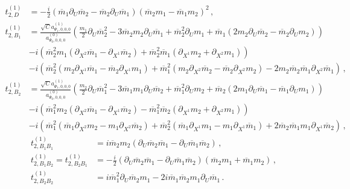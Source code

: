 	\begin{equation}
	\begin{aligned}
	t_{2,D}^{(1)} &= -\frac{i}{2} (\overline{m}_{1} \partial_{U}\overline{m}_{2} - \overline{m}_{2} \partial_{U}\overline{m}_{1} ) (\overline{m}_{2} m_{1}-\overline{m}_{1} m_{2})^2  \, , \\
	t_{2,B_1}^{(1)} &=  \frac{\sqrt{C} a^{(1)}_{\Psi_1,0,0,0}}{a^{(0)}_{\Psi_0,0,0,0}} \left( \frac{m_{1}}{2} \partial_{U}\overline{m}^2_{2} -3 \overline{m}_{2} m_{2} \partial_{U}\overline{m}_{1}  +\overline{m}_{2}^2 \partial_{U}m_{1} + \overline{m}_{1} \left(2 m_{2} \partial_{U}\overline{m}_{2}- \overline{m}_{2}\partial_{U}m_{2}\right) \right) \\ &-i  \left( \overline{m}_{2}^2 m_{1} (\partial_{X^2}\overline{m}_{1}-\partial_{X^1}\overline{m}_{2})+ \overline{m}_{2}^2 \overline{m}_{1} (\partial_{X^1}m_{2}+\partial_{X^2}m_{1}) \right) \\ &-i \left(\overline{m}_{2}^2 \left( m_{2}\partial_{X^1}\overline{m}_{1} -\overline{m}_{2} \partial_{X^1}m_{1}\right)+ \overline{m}_{1}^2\left( m_{2}\partial_{X^2}\overline{m}_{2} - \overline{m}_{2}\partial_{X^2}m_{2} \right)-2 m_{2} \overline{m}_{2} \overline{m}_{1} \partial_{X^2}\overline{m}_{1} \right) \, , \\
	t_{2,B_2}^{(1)} &= \frac{\sqrt{C} a^{(1)}_{\Psi_1,0,0,0}}{a^{(0)}_{\Psi_0,0,0,0}} \left(\frac{m_{2}}{2}\partial_{U}\overline{m}^2_{1} -3 \overline{m}_{1} m_{1} \partial_{U}\overline{m}_{2}+ \overline{m}_{1}^2\partial_{U}m_{2} + \overline{m}_{2}\left( 2 m_{1}  \partial_{U}\overline{m}_{1} -\overline{m}_{1}\partial_{U}m_{1}   \right) \right) \\ &- i \left( \overline{m}_{1}^2 m_{2} (\partial_{X^2}\overline{m}_{1}-\partial_{X^1}\overline{m}_{2})- \overline{m}_{1}^2 \overline{m}_{2} \left(\partial_{X^1}m_{2}+\partial_{X^2}m_{1}\right)\right) \\ &- i \left(\overline{m}_{1}^2 \left(\overline{m}_{1} \partial_{X^2}m_{2}- m_{1} \partial_{X^2}\overline{m}_{2} \right) + \overline{m}_{2}^2 \left(\overline{m}_{1} \partial_{X^1}m_{1}-  m_{1}\partial_{X^1}\overline{m}_{1} \right) + 2 \overline{m}_{2} \overline{m}_{1} m_{1}\partial_{X^1}\overline{m}_{2}\right)  \, , 
	\end{aligned}
	\end{equation}
	\begin{equation}
	\begin{aligned}
	t_{2,B_1 B_1}^{(1)} &=  i \overline{m}_{2} m_{2} (\partial_{U}\overline{m}_{2} \overline{m}_{1}-\partial_{U}\overline{m}_{1} \overline{m}_{2})  \, , \\
	t_{2,B_1 B_2}^{(1)} = t_{2,B_2 B_1}^{(1)}  &= - \frac{i}{2} (\partial_{U}\overline{m}_{2} \overline{m}_{1}-\partial_{U}\overline{m}_{1} \overline{m}_{2}) (\overline{m}_{2} m_{1}+\overline{m}_{1} m_{2})  \, , \\
	t_{2,B_2 B_2}^{(1)} &= i \overline{m}_{1}^2 \partial_{U}\overline{m}_{2}  m_{1} -2 i \overline{m}_{1} \overline{m}_{2} m_{1} \partial_{U}\overline{m}_{1} \, .
	\end{aligned}
	\end{equation}

